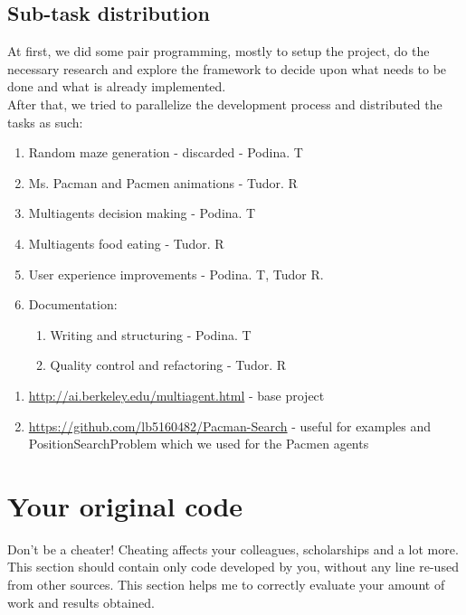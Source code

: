 \documentclass[a4paper,12pt]{report}
\begin{document}
\section{Sub-task distribution}
At first, we did some pair programming, mostly to setup the project, do the necessary research and explore the
framework to decide upon what needs to be done and what is already implemented.\\
After that, we tried to parallelize the development process and distributed the tasks as such: \begin{enumerate}
    \item Random maze generation - discarded - Podina. T
    \item Ms. Pacman and Pacmen animations - Tudor. R
    \item Multiagents decision making - Podina. T
    \item Multiagents food eating - Tudor. R
    \item User experience improvements - Podina. T, Tudor R.
    \item Documentation: \begin{enumerate}
        \item Writing and structuring - Podina. T
        \item Quality control and refactoring - Tudor. R
    \end{enumerate}
\end{enumerate}



\begin{enumerate}
    \item \url{http://ai.berkeley.edu/multiagent.html} - base project
    \item \url{https://github.com/lb5160482/Pacman-Search} \label{search_github_repo} - useful for examples and PositionSearchProblem which we used for the Pacmen agents
\end{enumerate}

\appendix

\chapter{Your original code}
Don't be a cheater! Cheating affects your colleagues, scholarships and a lot more.
This section should contain only code developed by you, without any line re-used from other sources. 
This section helps me to correctly evaluate your amount of work and results obtained. 
\end{document}
